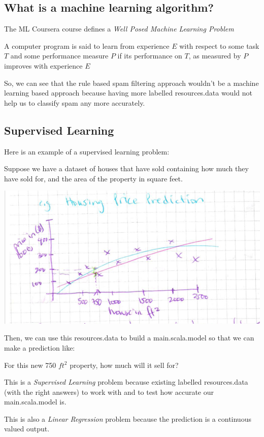 \documentclass[12pt]{article}
\begin{document}
\subsection{What is a machine learning algorithm?}

The ML Coursera course defines a \textit{Well Posed Machine Learning Problem}

A computer program is said to learn from experience $E$ with respect to some task $T$ and some performance measure $P$ 
if its performance on $T$, as measured by $P$ improves with experience $E$

So, we can see that the rule based spam filtering approach wouldn't be a machine learning based approach because having 
more labelled resources.data would not help us to classify spam any more accurately.

\subsection{Supervised Learning}

Here is an example of a supervised learning problem: 

Suppose we have a dataset of houses that have sold containing how much they have sold for, and the area of the property in square feet. 

\includegraphics[width={\textwidth}]{housing-prices}

Then, we can use this resources.data to build a main.scala.model so that we can make a prediction like:

For this new 750 $ft^2$ property, how much will it sell for?

This is a \textit{Supervised Learning} problem because existing labelled resources.data (with the right answers) to work with and to test how accurate our main.scala.model is.

This is also a \textit{Linear Regression} problem because the prediction is a continuous valued output. 
\end{document}
